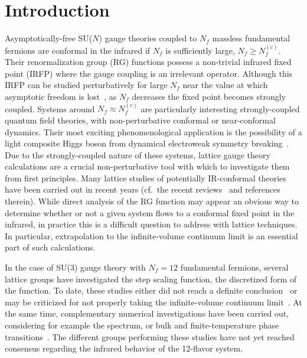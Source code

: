 
\section{Introduction} %
Asymptotically-free SU($N$) gauge theories coupled to $N_f$ massless fundamental fermions are conformal in the infrared if $N_f$ is sufficiently large, $N_f \geq N_f^{(c)}$.
Their renormalization group (RG) \be functions possess a non-trivial infrared fixed point (IRFP) where the gauge coupling is an irrelevant operator.
Although this IRFP can be studied perturbatively for large $N_f$ near the value at which asymptotic freedom is lost~\cite{Caswell:1974gg, Banks:1981nn}, as $N_f$ decreases the fixed point becomes strongly coupled.
Systems around $N_f \approx N_f^{(c)}$ are particularly interesting strongly-coupled quantum field theories, with non-perturbative conformal or near-conformal dynamics.
Their most exciting phenomenological application is the possibility of a light composite Higgs boson from dynamical electroweak symmetry breaking~\cite{Fodor:2012ty, Matsuzaki:2012xx, Appelquist:2013sia, Fodor:2014pqa, Aoki:2014oha}.
Due to the strongly-coupled nature of these systems, lattice gauge theory calculations are a crucial non-perturbative tool with which to investigate them from first principles.
Many lattice studies of potentially IR-conformal theories have been carried out in recent years (cf.~the recent reviews~\cite{Neil:2012cb, Giedt:2012it} and references therein).
While direct analysis of the RG \be function may appear an obvious way to determine whether or not a given system flows to a conformal fixed point in the infrared, in practice this is a difficult question to address with lattice techniques.
In particular, extrapolation to the infinite-volume continuum limit is an essential part of such calculations.

In the case of SU(3) gauge theory with $N_f = 12$ fundamental fermions, several lattice groups have investigated the step scaling function, the discretized form of the \be function.
To date, these studies either did not reach a definite conclusion~\cite{Hasenfratz:2010fi, Lin:2012iw} or may be criticized for not properly taking the infinite-volume continuum limit~\cite{Appelquist:2007hu, Appelquist:2009ty, Hasenfratz:2010fi, Hasenfratz:2011xn, Itou:2012qn, Petropoulos:2013gaa}.
At the same time, complementary numerical investigations have been carried out, considering for example the spectrum, or bulk and finite-temperature phase transitions~\cite{Deuzeman:2009mh, Fodor:2011tu, Appelquist:2011dp, DeGrand:2011cu, Cheng:2011ic, Cheng:2013eu, Fodor:2012uw, Fodor:2012et, Aoki:2012eq, Aoki:2013zsa, Jin:2012dw}.
The different groups performing these studies have not yet reached consensus regarding the infrared behavior of the 12-flavor system.

